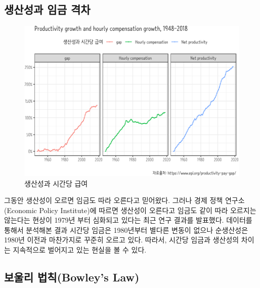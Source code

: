 \documentclass[smallextended]{svjour3}       %
\begin{document}
\hypertarget{wage-productivity-gap}{%
\subsection{생산성과 임금 격차}\label{wage-productivity-gap}}

\begin{figure}

{\centering \includegraphics[width=1\linewidth]{paper_files/figure-latex/productivity-gap-1} 

}

\caption{생산성과 시간당 급여}\label{fig:productivity-gap}
\end{figure}

그동안 생산성이 오르면 임금도 따라 오른다고 믿어왔다. 그러나 경제 정책
연구소(Economic Policy Institute)\cite{economic_policy_institute_2019}에
따르면 생산성이 오른다고 임금도 같이 따라 오르지는 않는다는 현상이
1979년 부터 심화되고 있다는 최근 연구 결과를 발표했다.
데이터\cite{bivens2014raising}를 통해서 분석해본 결과 시간당 임금은
1980년부터 별다른 변동이 없으나 순생산성은 1980년 이전과 마찬가지로
꾸준히 오르고 있다. 따라서, 시간당 임금과 생산성의 차이는 지속적으로
벌어지고 있는 현실을 볼 수 있다.

\hypertarget{bowley-law}{%
\subsection{보울리 법칙(Bowley's Law)}\label{bowley-law}}
\end{document}

